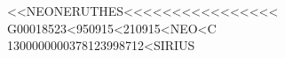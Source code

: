\documentclass[b6paper,10pt]{article}
\begin{document}
\begin{minipage}[b][110mm][t]{77mm}
{            }

            \vfill

            {\large\color{Sepia}
                {<<NEONERUTHES<<<<<<<<<<<<<<<<}\\
                {G00018523<950915<210915<NEO<C}\\
                {1300000000378123998712<SIRIUS}
            }



            
            

        \end{minipage}\hfill%
\end{document}
